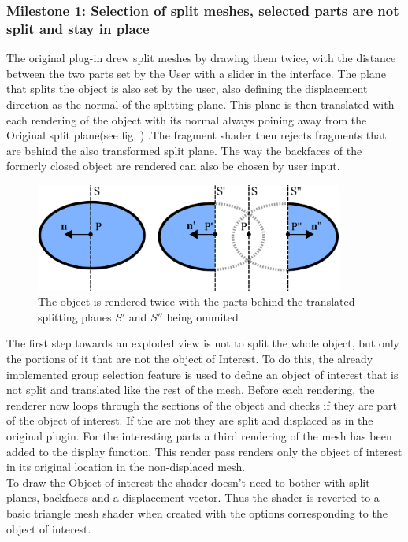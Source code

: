\subsubsection{Milestone 1: Selection of split meshes, selected parts are not split and stay in place} The original plug-in drew split meshes by drawing them twice, with the distance between the two parts set by the User with a slider in the interface. The plane  that splits the object is also set by the user, also defining the displacement direction as the normal of the splitting plane. This plane is then translated with each rendering of the object with its normal always poining away from the Original split plane(see fig. \label{fig:splitting_explained}) .The fragment shader then rejects fragments that are behind the also transformed split plane. The way the backfaces of the formerly closed object are rendered can also be chosen by user input.\\
\begin{figure}[tb]
	\centering
	\includegraphics[width=0.9\textwidth]{chapters/figures/splitting_explained}
	\caption{The object is rendered twice with the parts behind the translated splitting planes $S'$ and $S''$ being ommited}
	\label{fig:splitting_explained}
\end{figure}
The first step towards an exploded view is not to split the whole object, but only the portions of it that are not the object of Interest. To do this, the already implemented group selection feature is used to define an object of interest that is not split and translated like the rest of the mesh. Before each rendering, the renderer now loops through the sections of the object and checks if they are part of the object  of interest. If the are not they are split and displaced as in the original plugin. For the interesting parts a third rendering of the mesh has been added to the display function. This render pass renders only the object of interest in its original location in the non-displaced mesh.\\
To draw the Object of interest the shader doesn't need to bother with split planes, backfaces and a displacement vector. Thus the shader is reverted to a basic triangle mesh shader when created with the options corresponding to the object of interest.\\
